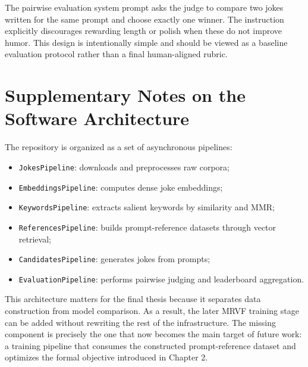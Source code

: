 The pairwise evaluation system prompt asks the judge to compare two jokes written for the same prompt and choose exactly one winner. The instruction explicitly discourages rewarding length or polish when these do not improve humor. This design is intentionally simple and should be viewed as a baseline evaluation protocol rather than a final human-aligned rubric.

\chapter{Supplementary Notes on the Software Architecture}

The repository is organized as a set of asynchronous pipelines:
\begin{itemize}
    \item \texttt{JokesPipeline}: downloads and preprocesses raw corpora;
    \item \texttt{EmbeddingsPipeline}: computes dense joke embeddings;
    \item \texttt{KeywordsPipeline}: extracts salient keywords by similarity and MMR;
    \item \texttt{ReferencesPipeline}: builds prompt-reference datasets through vector retrieval;
    \item \texttt{CandidatesPipeline}: generates jokes from prompts;
    \item \texttt{EvaluationPipeline}: performs pairwise judging and leaderboard aggregation.
\end{itemize}

This architecture matters for the final thesis because it separates data construction from model comparison. As a result, the later MRVF training stage can be added without rewriting the rest of the infrastructure. The missing component is precisely the one that now becomes the main target of future work: a training pipeline that consumes the constructed prompt-reference dataset and optimizes the formal objective introduced in Chapter 2.
